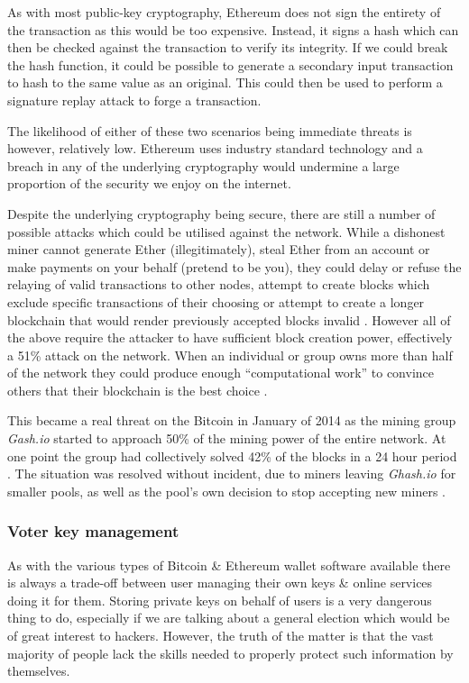 \documentclass{article}
\begin{document}
As with most public-key cryptography, Ethereum does not sign the entirety of the transaction as this would be too expensive. Instead, it signs a hash which can then be checked against the transaction to verify its integrity. If we could break the hash function, it could be possible to generate a secondary input transaction to hash to the same value as an original. This could then be used to perform a signature replay attack to forge a transaction.

The likelihood of either of these two scenarios being immediate threats is however, relatively low. Ethereum uses industry standard technology and a breach in any of the underlying cryptography would undermine a large proportion of the security we enjoy on the internet. 

Despite the underlying cryptography being secure, there are still a number of possible attacks which could be utilised against the network. While a dishonest miner cannot generate Ether (illegitimately), steal Ether from an account or make payments on your behalf (pretend to be you), they could delay or refuse the relaying of valid transactions to other nodes, attempt to create blocks which exclude specific transactions of their choosing or attempt to create a longer blockchain that would render previously accepted blocks invalid \citep{22_brave_new_coin_2016}. However all of the above require the attacker to have sufficient block creation power, effectively a 51\% attack on the network. When an individual or group owns more than half of the network they could produce enough ``computational work'' to convince others that their blockchain is the best choice \citep{41_yang_2011}.

This became a real threat on the Bitcoin in January of 2014 as the mining group \textit{Gash.io} started to approach 50\% of the mining power of the entire network. At one point the group had collectively solved 42\% of the blocks in a 24 hour period \citep{42_liu_2014}. The situation was resolved without incident, due to miners leaving \textit{Ghash.io} for smaller pools, as well as the pool’s own decision to stop accepting new miners \citep{41_yang_2011}.
	
	\subsubsection{Voter key management}
	As with the various types of Bitcoin \& Ethereum wallet software available there is always a trade-off between user managing their own keys \& online services doing it for them. Storing private keys on behalf of users is a very dangerous thing to do, especially if we are talking about a general election which would be of great interest to hackers. However, the truth of the matter is that the vast majority of people lack the skills needed to properly protect such information by themselves.
	
\end{document}
